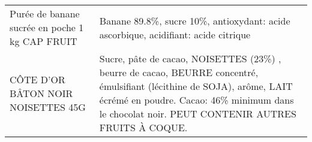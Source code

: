 \begin{longtable}{p{5cm}p{10cm}}
                                                           Purée de banane sucrée en poche 1 kg CAP FRUIT &                                                                                                                                                                                                                                                                                                                                                                                                                                                                                                                                                                                                                                                                                                                                                                                                                                                                                                                                                       Banane 89.8\%, sucre 10\%, antioxydant: acide ascorbique, acidifiant: acide citrique \\
                                                                      CÔTE D'OR BÂTON NOIR NOISETTES 45G  &                                                                                                                                                                                                                                                                                                                                                                                                                                                                                                                                                                                                                                                                                                                                                                                                                 Sucre, pâte de cacao, NOISETTES (23\%) , beurre de cacao, BEURRE concentré, émulsifiant (lécithine de SOJA), arôme, LAIT écrémé en poudre. Cacao: 46\% minimum dans le chocolat noir. PEUT CONTENIR AUTRES FRUITS À COQUE. \\

\end{longtable}
